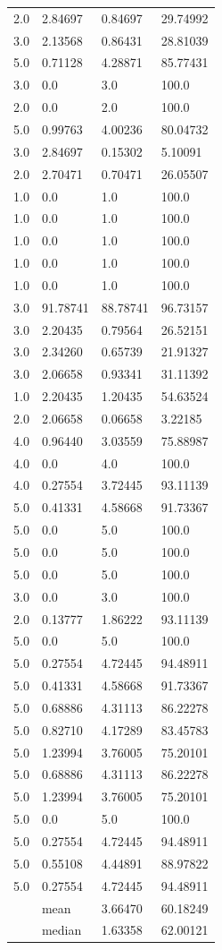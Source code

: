 \begin{longtable}{llll}
	2.0 & 2.84697 & 0.84697 & 29.74992 \\
	3.0 & 2.13568 & 0.86431 & 28.81039 \\
	5.0 & 0.71128 & 4.28871 & 85.77431 \\
	3.0 & 0.0 & 3.0 & 100.0 \\
	2.0 & 0.0 & 2.0 & 100.0 \\
	5.0 & 0.99763 & 4.00236 & 80.04732 \\
	3.0 & 2.84697 & 0.15302 & 5.10091 \\
	2.0 & 2.70471 & 0.70471 & 26.05507 \\
	1.0 & 0.0 & 1.0 & 100.0 \\
	1.0 & 0.0 & 1.0 & 100.0 \\
	1.0 & 0.0 & 1.0 & 100.0 \\
	1.0 & 0.0 & 1.0 & 100.0 \\
	1.0 & 0.0 & 1.0 & 100.0 \\
	3.0 & 91.78741 & 88.78741 & 96.73157 \\
	3.0 & 2.20435 & 0.79564 & 26.52151 \\
	3.0 & 2.34260 & 0.65739 & 21.91327 \\
	3.0 & 2.06658 & 0.93341 & 31.11392 \\
	1.0 & 2.20435 & 1.20435 & 54.63524 \\
	2.0 & 2.06658 & 0.06658 & 3.22185 \\
	4.0 & 0.96440 & 3.03559 & 75.88987 \\
	4.0 & 0.0 & 4.0 & 100.0 \\
	4.0 & 0.27554 & 3.72445 & 93.11139 \\
	5.0 & 0.41331 & 4.58668 & 91.73367 \\
	5.0 & 0.0 & 5.0 & 100.0 \\
	5.0 & 0.0 & 5.0 & 100.0 \\
	5.0 & 0.0 & 5.0 & 100.0 \\
	3.0 & 0.0 & 3.0 & 100.0 \\
	2.0 & 0.13777 & 1.86222 & 93.11139 \\
	5.0 & 0.0 & 5.0 & 100.0 \\
	5.0 & 0.27554 & 4.72445 & 94.48911 \\
	5.0 & 0.41331 & 4.58668 & 91.73367 \\
	5.0 & 0.68886 & 4.31113 & 86.22278 \\
	5.0 & 0.82710 & 4.17289 & 83.45783 \\
	5.0 & 1.23994 & 3.76005 & 75.20101 \\
	5.0 & 0.68886 & 4.31113 & 86.22278 \\
	5.0 & 1.23994 & 3.76005 & 75.20101 \\
	5.0 & 0.0 & 5.0 & 100.0 \\
	5.0 & 0.27554 & 4.72445 & 94.48911 \\
	5.0 & 0.55108 & 4.44891 & 88.97822 \\
	5.0 & 0.27554 & 4.72445 & 94.48911 \\ \hline
	& mean & 3.66470 & 60.18249 \\
  & median & 1.63358 & 62.00121
\end{longtable}

